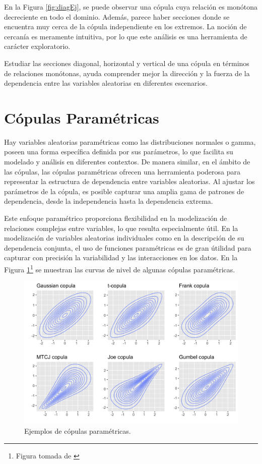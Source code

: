 En la Figura \ref{fig:diagEj}, se puede observar una cópula cuya relación es monótona decreciente en todo el dominio. Además, parece haber secciones donde se encuentra muy cerca de la cópula independiente en los extremos. La noción de cercanía es meramente intuitiva, por lo que este análisis es una herramienta de carácter exploratorio.

Estudiar las secciones diagonal, horizontal y vertical de una cópula en términos de relaciones monótonas, ayuda comprender mejor la dirección y la fuerza de la dependencia entre las variables aleatorias en diferentes escenarios. 




\section{Cópulas Paramétricas}

Hay variables aleatorias paramétricas como las distribuciones normales o gamma, poseen una forma específica definida por sus parámetros, lo que facilita su modelado y análisis en diferentes contextos. De manera similar, en el ámbito de las cópulas, las cópulas paramétricas ofrecen una herramienta poderosa para  representar la estructura de dependencia entre variables aleatorias. Al ajustar los parámetros de la cópula, es posible capturar una amplia gama de patrones de dependencia, desde la independencia hasta la dependencia extrema. 

Este enfoque paramétrico proporciona flexibilidad en la modelización de relaciones complejas entre variables, lo que resulta especialmente útil. En la modelización de variables aleatorias individuales como en la descripción de su dependencia conjunta, el uso de funciones paramétricas es de gran útilidad para capturar con precisión la variabilidad y las interacciones en los datos. En la Figura \ref{fig:Parametric}\footnote{Figura tomada de \cite{ImgCopulas}} se muestran las curvas de nivel de algunas cópulas paramétricas.

\begin{figure}[H]
    \centering
    \includegraphics[width = 0.7 \textwidth]{Imagenes/parametricCopulas.png}
    \caption{Ejemplos de cópulas paramétricas.}
    \label{fig:Parametric}
\end{figure}

